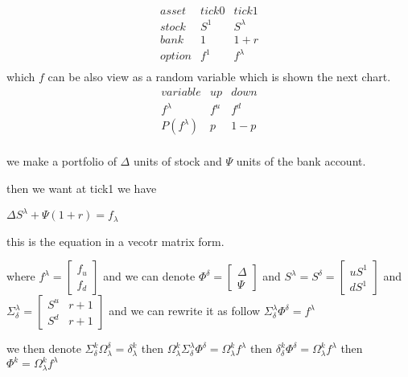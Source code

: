 \documentclass{article}
\theoremstyle{definition} %
\begin{document}
$$
    \begin{array}{c|ccc}
        asset  & tick0 & tick1     \\
        stock  & S^1   & S^\lambda \\
        \hline
        bank   & 1     & 1+r       \\
        \hline
        option & f^1   & f^\lambda \\
    \end{array}
$$
which $f$ can be also view as a random
variable which is shown the next chart.
$$
    \begin{array}{c|ccc}
        variable     & up  & down \\
        f^\lambda    & f^u & f^d  \\
        \hline
        P(f^\lambda) & p   & 1-p  \\
    \end{array}
$$

we make a portfolio of $\Delta$ units of
stock and $\Psi$ units of the bank account.

then we want at tick1 we have

$\Delta S^\lambda+\Psi(1+r)=f_\lambda$

this is the equation in a vecotr matrix form.

where
$f^\lambda=
    \begin{bmatrix}
        f_u \\
        f_d
    \end{bmatrix}
$
and we can denote
$\Phi^\delta=
    \begin{bmatrix}
        \Delta \\
        \Psi
    \end{bmatrix}
$
and
$S^\lambda=S^\delta=
    \begin{bmatrix}
        uS^1 \\
        dS^1
    \end{bmatrix}
$
and
$\Sigma^\lambda_\delta=
    \begin{bmatrix}
        S^u & r+1 \\
        S^d & r+1
    \end{bmatrix}
$
and we can rewrite it as follow
$\Sigma^\lambda_\delta \Phi^\delta=f^\lambda$

we then denote $\Sigma^k_\delta \Omega_\lambda^\delta=\delta^k_\lambda$
then
$\Omega_\lambda^k\Sigma^\lambda_\delta \Phi^\delta=\Omega_\lambda^kf^\lambda$
then
$\delta^k_\delta\Phi^\delta=\Omega_\lambda^kf^\lambda$
then
$\Phi^k=\Omega_\lambda^kf^\lambda$
\end{document}
